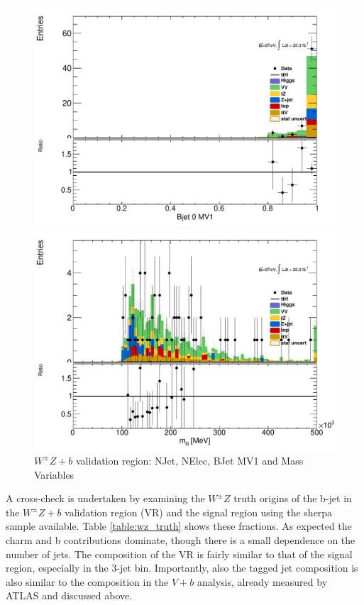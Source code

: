 \begin{figure}[!htbp]
\begin{minipage}[h]{0.5\textwidth}
    \centering \includegraphics[width=\textwidth]{figs/WZ/plotCand_3lep_VVb_BJet0MV1}
  \end{minipage}\hfill
  \begin{minipage}[h]{0.5\textwidth}
    \centering \includegraphics[width=\textwidth]{figs/WZ/plotCand_3lep_VVb_Mlll}
  \end{minipage}\hfill
\caption{$W^{\pm}Z+b$ validation region: NJet, NElec, BJet MV1 and Mass Variables} 
\label{figure:background_wz_z_b}
\end{figure} 

A cross-check is undertaken by examining the $W^{\pm}Z$ truth origins of the b-jet in the $W^{\pm}Z+b$ validation region (VR) and the signal region using the sherpa sample available. Table \ref{table:wz_truth} shows these fractions. As expected the charm and b contributions dominate, though there is a small dependence on the number of jets. The composition of the VR is fairly similar to that of the signal region, especially in the 3-jet bin. Importantly, also the tagged jet composition is also similar to the composition in the $V+b$ analysis, already measured by ATLAS and discussed above. 

